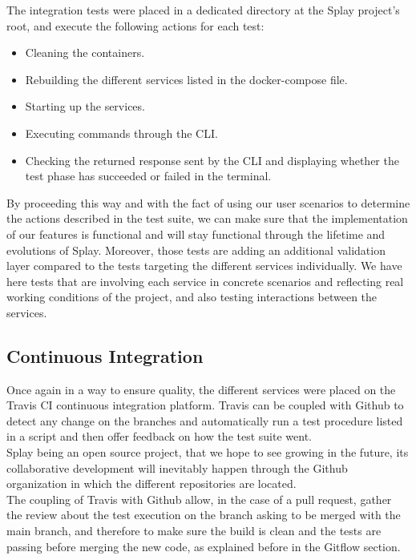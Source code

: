 \documentclass{eplmastersthesis}
\begin{document}
        The integration tests were placed in a dedicated directory at the Splay
        project's root, and execute the following actions for each test:

        \begin{itemize}
          \item Cleaning the containers.
          \item Rebuilding the different services listed in the docker-compose
          file.
          \item Starting up the services.
          \item Executing commands through the CLI.
          \item Checking the returned response sent by the CLI and displaying
          whether the test phase has succeeded or failed in the terminal.
        \end{itemize}

        By proceeding this way and with the fact of using our user scenarios to
        determine the actions described in the test suite, we can make sure
        that the implementation of our features is functional and will stay
        functional through the lifetime and evolutions of Splay. Moreover, those
        tests are adding an additional validation layer compared to the tests
        targeting the different services individually. We have here tests that
        are involving each service in concrete scenarios and reflecting real
        working conditions of the project, and also testing interactions
        between the services.

      \subsection{Continuous Integration}

        Once again in a way to ensure quality, the different services were placed
        on the Travis CI \cite{travis} continuous integration platform. Travis
        can be coupled with Github to detect any change on the branches and
        automatically run a test procedure listed in a script and then offer
        feedback on how the test suite went.\\

        Splay being an open source project, that we hope to see growing in the
        future, its collaborative development will inevitably happen through
        the Github organization in which the different repositories are located.\\
        The coupling of Travis with Github allow, in the case of a pull request,
        gather the review about the test execution on the branch asking to be
        merged with the main branch, and therefore to make sure the build is
        clean and the tests are passing before merging the new code, as
        explained before in the Gitflow section.
\end{document}
